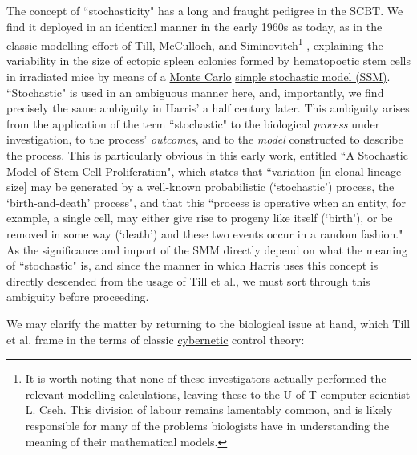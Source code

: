 The concept of ``stochasticity" has a long and fraught pedigree in the SCBT. We find it deployed in an identical manner in the early 1960s as today, as in the classic modelling effort of Till, McCulloch, and Siminovitch\footnote{It is worth noting that none of these investigators actually performed the relevant modelling calculations, leaving these to the U of T computer scientist L. Cseh. This division of labour remains lamentably common, and is likely responsible for many of the problems biologists have in understanding the meaning of their mathematical models.} \cite{Till1964}, explaining the variability in the size of ectopic spleen colonies formed by hematopoetic stem cells in irradiated mice by means of a \hyperref[MonteCarlo]{Monte Carlo} \hyperref[SSM]{simple stochastic model (SSM)}. \label{TMSmodel} ``Stochastic" is used in an ambiguous manner here, and, importantly, we find precisely the same ambiguity in Harris' a half century later. This ambiguity arises from the application of the term ``stochastic" to the biological \textit{process} under investigation, to the process' \textit{outcomes}, and to the \textit{model} constructed to describe the process. This is particularly obvious in this early work, entitled ``A Stochastic Model of Stem Cell Proliferation", which states that ``variation [in clonal lineage size] may be generated by a well-known probabilistic (`stochastic') process, the `birth-and-death' process", and that this ``process is operative when an entity, for example, a single cell, may either give rise to progeny like itself (`birth'), or be removed in some way (`death') and these two events occur in a random fashion." \cite{Till1964} As the significance and import of the SMM directly depend on what the meaning of ``stochastic" is, and since the manner in which Harris uses this concept is directly descended from the usage of Till et al., we must sort through this ambiguity before proceeding.

We may clarify the matter by returning to the biological issue at hand, which Till et al. frame in the terms of classic \hyperref[cybernetics]{cybernetic} \label{TMSmodel2} control theory:

